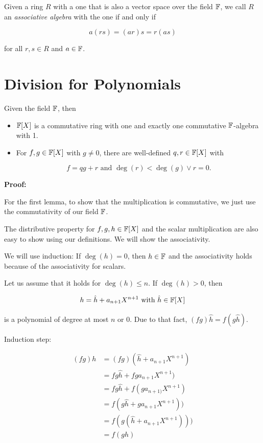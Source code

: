 Given a ring \(R\) with a one that is also a vector space over the field \(\mathbb{F}\), we call
\(R\) an \emph{associative algebra} with the one if and only if

\[
	a(rs) = (ar)s = r(as)
\]

for all \(r,s \in R\) and \(a \in \mathbb{F}\).

\section{Division for Polynomials}

Given the field \(\mathbb{F}\), then

\begin{itemize}

	\item  \(\mathbb{F}[X]\) is a commutative ring with one and exactly one commutative \(\mathbb{F}\)-algebra with 1.

	\item For \(f, g \in \mathbb{F}[X]\) with \(g \ne 0\), there are well-defined \(q,r \in \mathbb{F}[X]\) with

	      \[
		      f = qg + r \text{ and } \deg(r) < \deg(g) \lor r = 0.
	      \]

\end{itemize}

\textbf{Proof:}

For the first lemma, to show that the multiplication is commutative, we just
use the commutativity of our field \(\mathbb{F}\).

The distributive property for \(f,g,h \in \mathbb{F} [X]\) and the scalar multiplication
are also easy to show using our definitions. We will show the associativity.

We will use induction: If \(\deg(h) = 0\), then \(h \in \mathbb{F}\) and the associativity holds because of the
associativity for scalars.

Let us assume that it holds for \(\deg(h) \le n\). If \(\deg(h) > 0\), then

\[
	h = \hat{h} + a_{n + 1}X^{n + 1} \text{ with } \hat{h} \in \mathbb{F} [X]
\]

is a polynomial of degree at most \(n\) or 0. Due to that fact, \((fg)\hat{h} = f(g\hat{h})\).

Induction step:

\begin{align*}
	(fg)h & = (fg)(\hat{h} + a_{n + 1}X^{n + 1})  \\
	      & = fg\hat{h} + fga_{n + 1}X^{n + 1})   \\
	      & = fg\hat{h} + f(ga_{n + 1)}X^{n + 1}) \\
	      & = f(g\hat{h} + ga_{n + 1}X^{n + 1}))  \\
	      & = f(g(\hat{h} + a_{n + 1}X^{n + 1}))) \\
	      & = f(gh)
\end{align*}

